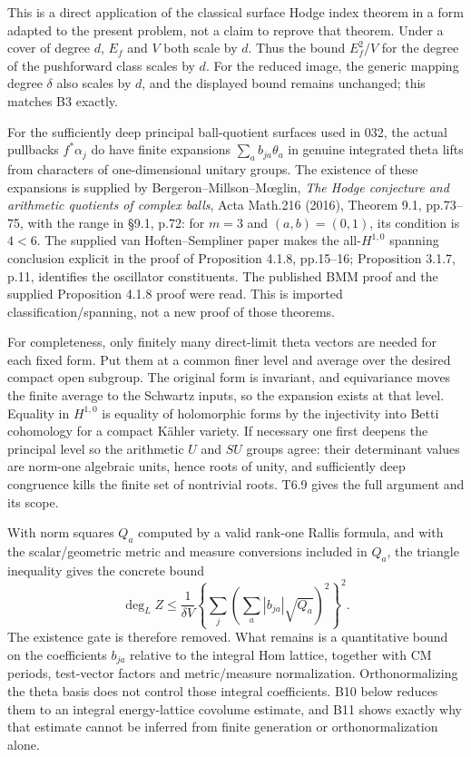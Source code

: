 This is a direct application of the classical surface Hodge index theorem in a form adapted to the present problem, not a claim to reprove that theorem. Under a cover of degree \(d\), \(E_f\) and \(V\) both scale by \(d\). Thus the bound \(E_f^2/V\) for the degree of the pushforward class scales by \(d\). For the reduced image, the generic mapping degree \(\delta\) also scales by \(d\), and the displayed bound remains unchanged; this matches B3 exactly.

For the sufficiently deep principal ball-quotient surfaces used in 032, the actual pullbacks \(f^*\alpha_j\) do have finite expansions \(\sum_a b_{ja}\theta_a\) in genuine integrated theta lifts from characters of one-dimensional unitary groups. The existence of these expansions is supplied by Bergeron--Millson--Mœglin, \emph{The Hodge conjecture and arithmetic quotients of complex balls}, Acta Math.216 (2016), Theorem 9.1, pp.73--75, with the range in §9.1, p.72: for \(m=3\) and \((a,b)=(0,1)\), its condition is \(4<6\). The supplied van Hoften--Sempliner paper makes the all-\(H^{1,0}\) spanning conclusion explicit in the proof of Proposition 4.1.8, pp.15--16; Proposition 3.1.7, p.11, identifies the oscillator constituents. The published BMM proof and the supplied Proposition 4.1.8 proof were read. This is imported classification/spanning, not a new proof of those theorems.

For completeness, only finitely many direct-limit theta vectors are needed for each fixed form. Put them at a common finer level and average over the desired compact open subgroup. The original form is invariant, and equivariance moves the finite average to the Schwartz inputs, so the expansion exists at that level. Equality in \(H^{1,0}\) is equality of holomorphic forms by the injectivity into Betti cohomology for a compact Kähler variety. If necessary one first deepens the principal level so the arithmetic \(U\) and \(SU\) groups agree: their determinant values are norm-one algebraic units, hence roots of unity, and sufficiently deep congruence kills the finite set of nontrivial roots. T6.9 gives the full argument and its scope.

With norm squares \(Q_a\) computed by a valid rank-one Rallis formula, and with the scalar/geometric metric and measure conversions included in \(Q_a\), the triangle inequality gives the concrete bound \[
 \deg_L Z\leq\frac{1}{\delta V}
 \left\{\sum_j\left(\sum_a|b_{ja}|\sqrt{Q_a}\right)^2\right\}^2.
\] The existence gate is therefore removed. What remains is a quantitative bound on the coefficients \(b_{ja}\) relative to the integral Hom lattice, together with CM periods, test-vector factors and metric/measure normalization. Orthonormalizing the theta basis does not control those integral coefficients. B10 below reduces them to an integral energy-lattice covolume estimate, and B11 shows exactly why that estimate cannot be inferred from finite generation or orthonormalization alone.

